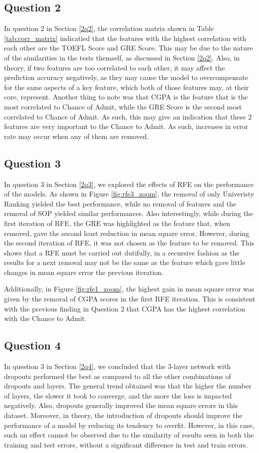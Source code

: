 \subsection{Question 2}
In question 2 in Section \ref{2q2}, the correlation matrix shown in Table \ref{tab:corr_matrix} indicatied that the features with the highest correlation with each other are the TOEFL Score and GRE Score. This may be due to the nature of the similarities in the tests themself, as discussed in Section \ref{2q2}. Also, in theory, if two features are too correlated to each other, it may affect the prediction accuracy negatively, as they may cause the model to overcompensate for the same aspects of a key feature, which both of those features may, at their core, represent. Another thing to note was that CGPA is the feature that is the most correlated to Chance of Admit, while the GRE Score is the second most correlated to Chance of Admit. As such, this may give an indication that these 2 features are very important to the Chance to Admit. As such, increases in error rate may occur when any of them are removed.

\subsection{Question 3}
In question 3 in Section \ref{2q3}, we explored the effects of RFE on the performance of the models. As shown in Figure \ref{fig:rfe3_zoom}, the removal of only Univeristy Ranking yielded the best performance, while no removal of features and the removal of SOP yielded similar performances. Also interestingly, while during the first iteration of RFE, the GRE was highlighted as the feature that, when removed, gave the second least reduction in mean square error. However, during the second iteration of RFE, it was not chosen as the feature to be removed. This shows that a RFE must be carried out dutifully, in a recursive fashion as the results for a next removal may not be the same as the feature which gave little changes in mean square error the previous iteration. 

Additionally, in Figure \ref{fig:rfe1_zoom}, the highest gain in mean square error was given by the removal of CGPA scores in the first RFE iteration. This is consistent with the previous finding in Question 2 that CGPA has the highest correlation with the Chance to Admit.

\subsection{Question 4}
In question 3 in Section \ref{2q4}, we concluded that the 3-layer network with dropouts performed the best as compared to all the other combinations of dropouts and layers. The general trend obtained was that the higher the number of layers, the slower it took to converge, and the more the loss is impacted negatively. Also, dropouts generally improved the mean square errors in this dataset. Moreover, in theory, the introduction of dropouts should improve the performance of a model by reducing its tendency to overfit. However, in this case, such an effect cannot be observed due to the similarity of results seen in both the training and test errors, without a significant difference in test and train errors.

